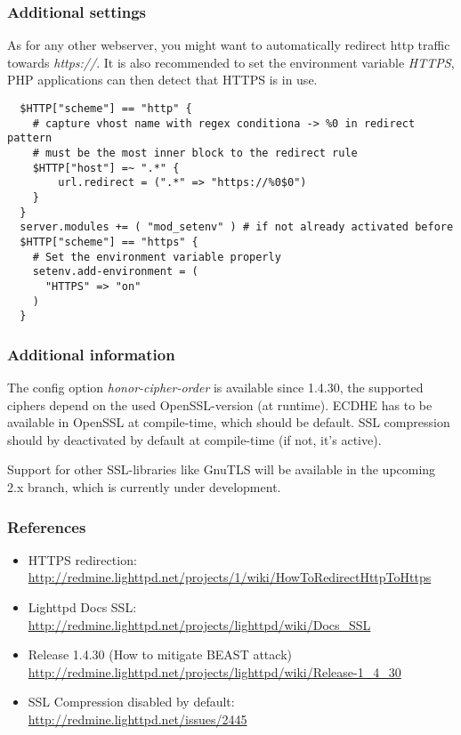 \subsubsection{Additional settings}
As for any other webserver, you might want to automatically redirect http
traffic towards \emph{https://}. It is also recommended to set the environment
variable \emph{HTTPS}, PHP applications can then detect that HTTPS is in use.

\begin{lstlisting}
  $HTTP["scheme"] == "http" {
    # capture vhost name with regex conditiona -> %0 in redirect pattern
    # must be the most inner block to the redirect rule
    $HTTP["host"] =~ ".*" {
        url.redirect = (".*" => "https://%0$0")
    }
  }
  server.modules += ( "mod_setenv" ) # if not already activated before
  $HTTP["scheme"] == "https" {
    # Set the environment variable properly
    setenv.add-environment = (
      "HTTPS" => "on"
    )
  }
\end{lstlisting}

\subsubsection{Additional information} 
The config option \emph{honor-cipher-order} is available since 1.4.30, the
supported ciphers depend on the used OpenSSL-version (at runtime). ECDHE has to
be available in OpenSSL at compile-time, which should be default. SSL
compression should by deactivated by default at compile-time (if not, it's
active).

Support for other SSL-libraries like GnuTLS will be available in the upcoming
2.x branch, which is currently under development.

\subsubsection{References} 
\begin{itemize}
  \item HTTPS redirection: \url{http://redmine.lighttpd.net/projects/1/wiki/HowToRedirectHttpToHttps}
  \item Lighttpd Docs SSL: \url{http://redmine.lighttpd.net/projects/lighttpd/wiki/Docs\_SSL}
  \item Release 1.4.30 (How to mitigate BEAST attack) \url{http://redmine.lighttpd.net/projects/lighttpd/wiki/Release-1\_4\_30}
  \item SSL Compression disabled by default: \url{http://redmine.lighttpd.net/issues/2445}
\end{itemize}

